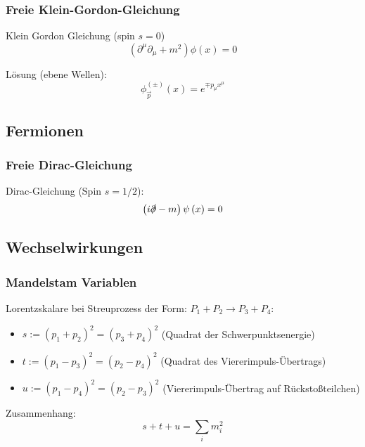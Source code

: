 		\subsubsection{Freie Klein-Gordon-Gleichung}
			\noindent
			Klein Gordon Gleichung (spin $s=0$)
			\begin{equation}
				\left(\partial^\mu\partial_\mu+m^2\right) \phi(x) = 0
			\end{equation}

			\noindent
			Lösung (ebene Wellen):
			\begin{equation}
				{\phi}^{ ( \pm ) }_{\vec{p}} (x) = e^{\mp p_\mu x^\mu}
			\end{equation}

	\subsection{Fermionen}
		\subsubsection{Freie Dirac-Gleichung}
			\noindent
			Dirac-Gleichung (Spin $s=1/2$):
			\begin{equation}
				\left(  i\slashed{\partial} - m  \right) \psi\left( x \right) = 0
			\end{equation}





	\subsection{Wechselwirkungen}
		\subsubsection{Mandelstam Variablen}
			\noindent
			Lorentzskalare bei Streuprozess der Form: $P_1 + P_2 \rightarrow P_3 + P_4$:
			\begin{itemize}\itemsep -0pt	%
				\item $s:=(p_1+p_2)^2=(p_3+p_4)^2$ \hfill{(Quadrat der Schwerpunktsenergie)}
				\item $t:=(p_1-p_3)^2=(p_2-p_4)^2$ \hfill{(Quadrat des Viererimpuls-Übertrags)}
				\item $u:=(p_1-p_4)^2=(p_2-p_3)^2$ \hfill{(Viererimpuls-Übertrag auf Rückstoßteilchen)}
			\end{itemize}

			\noindent
			Zusammenhang:
			\begin{equation}
				s+t+u = \sum_i m_i^2
			\end{equation}
